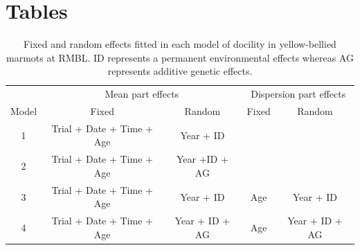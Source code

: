 \documentclass[a4paper,12pt,twoside]{article}
\begin{document}
	
	
	\newpage
	\section*{Tables}
	
	\begin{table}[!ht]
		\caption{Fixed and random effects fitted in each model of docility in yellow-bellied marmots at RMBL. 
			ID represents a permanent environmental effects whereas AG represents additive genetic effects.}
		\label{Tab:models}
		\centering
		\begin{tabular}{c c c c c}
			\hline
			\multicolumn{1}{c}{} &
			\multicolumn{2}{c}{Mean part effects} &
			\multicolumn{2}{c}{Dispersion part effects}\\ 
			Model & Fixed & Random & Fixed & Random \\
			\hline
			1 & Trial + Date + Time + Age & Year + ID & & \\
			2 & Trial + Date + Time + Age & Year +ID + AG & & \\
			3 & Trial + Date + Time + Age & Year + ID & Age & Year + ID \\
			4 & Trial + Date + Time + Age & Year + ID + AG & Age & Year + ID + AG\\
			\hline
		\end{tabular}
	\end{table}
	\newpage
	
\end{document}
